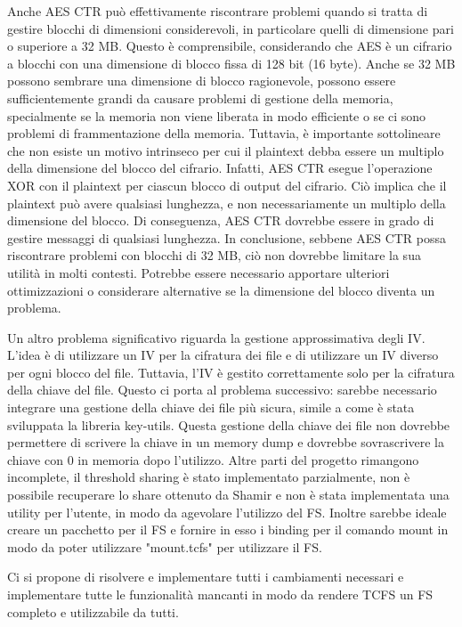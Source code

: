 Anche AES CTR può effettivamente riscontrare problemi quando si tratta di gestire blocchi di dimensioni considerevoli, in particolare quelli di dimensione pari o superiore a 32 MB. Questo è comprensibile, considerando che AES è un cifrario a blocchi con una dimensione di blocco fissa di 128 bit (16 byte). Anche se 32 MB possono sembrare una dimensione di blocco ragionevole, possono essere sufficientemente grandi da causare problemi di gestione della memoria, specialmente se la memoria non viene liberata in modo efficiente o se ci sono problemi di frammentazione della memoria. Tuttavia, è importante sottolineare che non esiste un motivo intrinseco per cui il plaintext debba essere un multiplo della dimensione del blocco del cifrario. Infatti, AES CTR esegue l’operazione XOR con il plaintext per ciascun blocco di output del cifrario. Ciò implica che il plaintext può avere qualsiasi lunghezza, e non necessariamente un multiplo della dimensione del blocco. Di conseguenza, AES CTR dovrebbe essere in grado di gestire messaggi di qualsiasi lunghezza. In conclusione, sebbene AES CTR possa riscontrare problemi con blocchi di 32 MB, ciò non dovrebbe limitare la sua utilità in molti contesti. Potrebbe essere necessario apportare ulteriori ottimizzazioni o considerare alternative se la dimensione del blocco diventa un problema.

Un altro problema significativo riguarda la gestione approssimativa degli IV. L’idea è di utilizzare un IV per la cifratura dei file e di utilizzare un IV diverso per ogni blocco del file. Tuttavia, l’IV è gestito correttamente solo per la cifratura della chiave del file. Questo ci porta al problema successivo: sarebbe necessario integrare una gestione della chiave dei file più sicura, simile a come è stata sviluppata la libreria key-utils. Questa gestione della chiave dei file non dovrebbe permettere di scrivere la chiave in un memory dump e dovrebbe sovrascrivere la chiave con 0 in memoria dopo l’utilizzo. Altre parti del progetto rimangono incomplete, il threshold sharing è stato implementato parzialmente, non è possibile recuperare lo share ottenuto da Shamir e non è stata implementata una utility per l'utente, in modo da agevolare l'utilizzo del FS. Inoltre sarebbe ideale creare un pacchetto per il FS e fornire in esso i binding per il comando mount in modo da poter utilizzare "mount.tcfs" per utilizzare il FS.

Ci si propone di risolvere e implementare tutti i cambiamenti necessari e implementare tutte le funzionalità mancanti in modo da rendere TCFS un FS completo e utilizzabile da tutti.